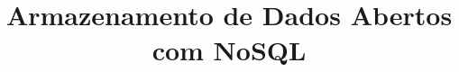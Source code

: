 \documentclass[bacharelado]{unb-cic}
\title{Armazenamento de Dados Abertos com NoSQL}
\begin{document}
  \maketitle
  \pretextual

  \tableofcontents
  \listoffigures
  \listoftables

  \textual
  
  
  
  
  
  
  

  \postextual
  
  
\end{document}
